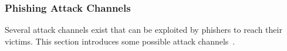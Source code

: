

\subsubsection{Phishing Attack Channels}
Several attack channels exist that can be exploited by phishers to reach their victims.
 This section introduces some possible attack channels~\cite{phishing2010ramazan, phishingtechniques}.
 
